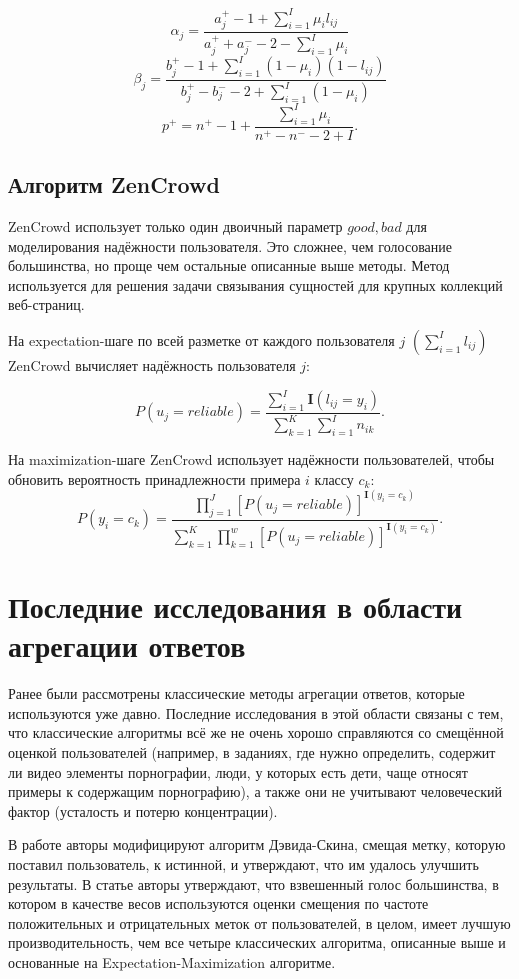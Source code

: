 \documentclass[specification,annotation,times]{itmo-student-thesis}
\begin{document}
\[\alpha_{j}=\frac{a_{j}^{+}-1+\sum_{i=1}^{I}\mu_{i}l_{ij}}{a_{j}^{+}+a_{j}^{-}-2-\sum_{i=1}^{I}\mu_{i}}\]
\[\beta_{j}=\frac{b_{j}^{+}-1+\sum_{i=1}^{I}(1-\mu_{i})(1-l_{ij})}{b_{j}^{+}-b_{j}^{-}-2+\sum_{i=1}^{I}(1-\mu_{i})}\]
\[p^{+}=n^{+}-1+\frac{\sum_{i=1}^{I}\mu_{i}}{n^{+}-n^{-}-2+I}.\]

\subsection{Алгоритм ZenCrowd}
ZenCrowd \cite{demartini2012zencrowd} использует только один двоичный параметр ${good, bad}$ для моделирования надёжности пользователя. Это сложнее, чем голосование большинства, но проще чем остальные описанные выше методы. Метод используется для решения задачи связывания сущностей для крупных коллекций веб-страниц.

На expectation-шаге по всей разметке от каждого пользователя $j$ $(\sum_{i=1}^{I}l_{ij})$ ZenCrowd вычисляет надёжность пользователя $j$:

\[P(u_{j}=reliable)=\frac{\sum_{i=1}^{I}\mathbf{I}(l_{ij}=y_{i})}{\sum_{k=1}^{K}\sum_{i=1}^{I}n_{ik}}.\]

На maximization-шаге ZenCrowd использует надёжности пользователей, чтобы обновить вероятность принадлежности примера $i$ классу $c_{k}$:
\[P(y_{i}=c_{k})=\frac{\prod_{j=1}^{J}[P(u_{j}=reliable)]^{\mathbf{I}(y_{i}=c_{k})}}{\sum_{k=1}^{K}\prod_{k=1}^{w}[P(u_{j}=reliable)]^{\mathbf{I}(y_{i}=c_{k})}}.\]

\section{Последние исследования в области агрегации ответов}
Ранее были рассмотрены классические методы агрегации ответов, которые используются уже давно. Последние исследования в этой области связаны с тем, что классические алгоритмы всё же не очень хорошо справляются со смещённой оценкой пользователей (например, в заданиях, где нужно определить, содержит ли видео элементы порнографии, люди, у которых есть дети, чаще относят примеры к содержащим порнографию), а также они не учитывают человеческий фактор (усталость и потерю концентрации).

В работе \cite{sheng2008get} авторы модифицируют алгоритм Дэвида-Скина, смещая метку, которую поставил пользователь, к истинной, и утверждают, что им удалось улучшить результаты. В статье \cite{zhang2017consensus} авторы утверждают, что взвешенный голос большинства, в котором в качестве весов используются оценки смещения по частоте положительных и отрицательных меток от пользователей, в целом, имеет лучшую производительность, чем все четыре классических алгоритма, описанные выше и основанные на Expectation-Maximization алгоритме.
\end{document}
